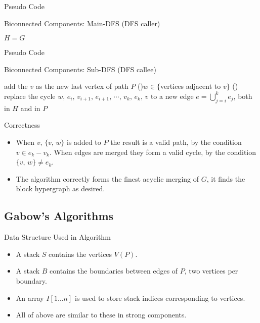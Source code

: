 \documentclass{beamer}
\begin{document}
\begin{frame}{Pseudo Code}
	\SetAlFnt{\small}
	\begin{algorithm}[H]
		\caption{Biconnected Components: Main-DFS (DFS caller)}
		$H=G$\;
	\end{algorithm}
\end{frame}

\begin{frame}{Pseudo Code}
	\SetAlFnt{\small}
	\begin{algorithm}[H]
		\caption{Biconnected Components: Sub-DFS (DFS callee)}
		add the $v$ as the new last vertex of path $P$\;
		\For(){$w\in \{$vertices adjacent to $v\}$}{
			\Else(){
				replace the cycle $w,\,e_i,\,v_{i+1},\,e_{i+1},\,\cdots,\,v_k,\,e_k,\,v$
				to a new edge $e=\bigcup_{j=i}^ke_j$, both in $H$ and in $P$\;
			}
		}
	\end{algorithm}
\end{frame}

\begin{frame}{Correctness}
	\begin{itemize}
		\item
		When $v,\,\{v,\,w\}$ is added to $P$ the result is a valid path, by the
		condition $v\in e_k-v_k$. When edges are merged they form a valid cycle,
		by the condition $\{v,\,w\}\neq e_k$.
		\item
		The algorithm correctly forms the finest acyclic merging of $G$, it finds
		the block hypergraph as desired.
	\end{itemize}
\end{frame}

\subsection{Gabow's Algorithms}

\begin{frame}{Data Structure Used in Algorithm}
	\begin{itemize}
		\item
		A \alert{stack $S$} contains the vertices $V(P)$.
		\item
		A \alert{stack $B$} contains the boundaries between edges of $P$, two vertices per boundary.
		\item
		An array \alert{$I[1\ldots n]$} is used to store stack indices corresponding to vertices.
		\item
		All of above are similar to these in strong components.
	\end{itemize}
\end{frame}
\end{document}

